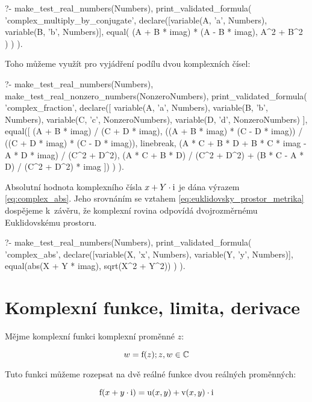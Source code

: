 \begin{prolog}
?-	make_test_real_numbers(Numbers),
	print_validated_formula(
		'complex_multiply_by_conjugate',
		declare([variable(A, 'a', Numbers), variable(B, 'b', Numbers)],
			equal(
				(A + B * imag) * (A - B * imag),
				A^2 + B^2
			)
		)
	).
\end{prolog}

Toho můžeme využít pro vyjádření podílu dvou komplexních čísel:

\begin{prolog}
?-	make_test_real_numbers(Numbers),
	make_test_real_nonzero_numbers(NonzeroNumbers),
	print_validated_formula(
		'complex_fraction',
		declare([
			variable(A, 'a', Numbers), variable(B, 'b', Numbers),
			variable(C, 'c', NonzeroNumbers), variable(D, 'd', NonzeroNumbers)
		],
			equal([
				(A + B * imag) / (C + D * imag),
				((A + B * imag) * (C - D * imag)) / ((C + D * imag) * (C - D * imag)),
				linebreak,
				(A * C + B * D + B * C * imag - A * D * imag) / (C^2 + D^2),
				(A * C + B * D) / (C^2 + D^2) + (B * C - A * D) / (C^2 + D^2) * imag
			])
		)
	).
\end{prolog}

Absolutní hodnota komplexního čísla \(x + Y \cdot \mathrm{i}\) je dána výrazem \eqref{eq:complex_abs}. Jeho srovnáním se vztahem \eqref{eq:euklidovsky_prostor_metrika} dospějeme k~závěru, že komplexní rovina odpovídá dvojrozměrnému Euklidovskému prostoru.

\begin{prolog}
?-	make_test_real_numbers(Numbers),
	print_validated_formula(
		'complex_abs',
		declare([variable(X, 'x', Numbers), variable(Y, 'y', Numbers)],
			equal(abs(X + Y * imag), sqrt(X^2 + Y^2))
		)
	).
\end{prolog}

\section{Komplexní funkce, limita, derivace}

Mějme komplexní funkci komplexní proměnné \(z\):

\begin{equation}
w = \mathrm{f}(z); z, w \in \mathbb{C}
\end{equation}

Tuto funkci můžeme rozepsat na dvě reálné funkce dvou reálných proměnných:

\begin{equation}
\mathrm{f}(x + y \cdot \mathrm{i}) = \mathrm{u}(x, y) + \mathrm{v}(x, y) \cdot \mathrm{i}
\end{equation}

